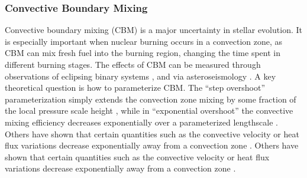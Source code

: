 {\color{purple}
{\color{purple}
\subsubsection{Convective Boundary Mixing}
}}


Convective boundary mixing (CBM) is a major uncertainty in stellar evolution. It is especially important when nuclear burning occurs in a convection zone, as CBM can mix fresh fuel into the burning region, changing the time spent in different burning stages. The effects of CBM can be measured through observations of eclipsing binary systems \citep[e.g.,][]{Stancliffe_2015,claret:16,Valle_2016}, and via asteroseismology \citep[e.g.,][]{Constantino:2015,deheuvels:16,Ghasemi_2016}. A key theoretical question is how to parameterize CBM. The ``step overshoot'' parameterization simply extends the convection zone mixing by some fraction of the local pressure scale height \citep[e.g.,][]{Shaviv_1973}, while in ``exponential overshoot'' the convective mixing efficiency decreases exponentially over a parameterized lengthscale \citep{Freytag1996}. Others have shown that certain quantities such as the convective velocity or heat flux variations decrease exponentially away from a convection zone \citep{Pratt_2017}. Others have shown that certain quantities such as the convective velocity or heat flux variations decrease exponentially away from a convection zone \citep{Pratt_2017}.
